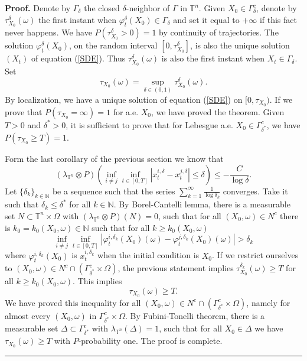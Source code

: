 \documentclass[11pt,a4paper]{article}%
\newenvironment{proof}[1][Proof]{\textbf{#1.} }{\ \rule{0.5em}{0.5em}}
\begin{document}
\begin{proof}
Denote by $\Gamma_{\delta}$ the closed $\delta$-neighbor of $\Gamma$ in
${\mathbb{T}}^{n}$. Given $X_{0}\in\Gamma_{\delta}^{c}$, denote by
$\tau_{X_{0}}^{\delta}( \omega) $ the first instant when $\varphi_{t}^{\delta
}( X_{0}) \in\Gamma_{\delta}$ and set it equal to $+\infty$ if this fact never
happens. We have $P\left(  \tau_{X_{0}}^{\delta}>0\right)  =1$ by continuity
of trajectories. The solution $\varphi_{t}^{\delta}\left(  X_{0}\right)  $, on
the random interval $\left[  0,\tau_{X_{0}}^{\delta}\right]  $, is also the
unique solution $\left(  X_{t}\right)  $ of equation (\ref{SDE}).  Thus
$\tau_{X_{0}}^{\delta}( \omega) $ is also the first instant when $X_{t}%
\in\Gamma_{\delta}$. Set%
\[
\tau_{X_{0}}( \omega) =\sup_{\delta\in( 0,1) }\tau_{X_{0}}^{\delta}( \omega)
.
\]
By localization, we have a unique solution of equation (\ref{SDE}) on
$[0,\tau_{X_{0}})$. If we prove that $P( \tau_{X_{0}}=\infty) =1$ for a.e.
$X_{0}$, we have proved the theorem. Given $T>0$ and $\delta^{\ast}>0$, it is
sufficient to prove that for Lebesgue a.e. $X_{0}\in\Gamma_{\delta^{\ast}}%
^{c}$, we have $P( \tau_{X_{0}}\geq T) =1$.

Form the last corollary of the previous section we know that%
\[
( \lambda_{{\mathbb{T}}^{n}}\otimes P) ( \inf_{i\neq j}\inf_{t\in[ 0,T] }|
x_{t}^{i,\delta}-x_{t}^{j,\delta}| \leq\delta) \leq-\frac{C}{\log\delta}.
\]
Let $\{ \delta_{k}\} _{k\in\mathbb{N}}$ be a sequence such that the series
$\sum_{k=1}^{\infty}\frac{1}{\log\delta_{k}}$ converges. Take it such that
$\delta_{k}\leq\delta^{\ast}$ for all $k\in\mathbb{N}$. By Borel-Cantelli
lemma, there is a measurable set $N\subset{\mathbb{T}}^{n}\times\Omega$ with
$( \lambda_{{\mathbb{T}}^{n}}\otimes P) ( N) =0$, such that for all $(
X_{0},\omega) \in N^{c}$ there is $k_{0}=k_{0}( X_{0},\omega) \in\mathbb{N}$
such that for all $k\geq k_{0}( X_{0},\omega) $%
\[
\inf_{i\neq j}\inf_{t\in[ 0,T] }| \varphi_{t}^{i,\delta_{k}}( X_{0}) ( \omega)
-\varphi_{t}^{j,\delta_{k}}( X_{0}) ( \omega) | >\delta_{k}%
\]
where $\varphi_{t}^{i,\delta_{k}}( X_{0}) $ is $x_{t}^{i,\delta_{k}}$ when the
initial condition is $X_{0}$. If we restrict ourselves to $( X_{0},\omega) \in
N^{c}\cap( \Gamma_{\delta^{\ast}}^{c}\times\Omega) $, the previous statement
implies $\tau_{X_{0}}^{\delta_{k}}( \omega) \geq T$ for all $k\geq k_{0}(
X_{0},\omega) $. This implies
\[
\tau_{X_{0}}( \omega) \geq T.
\]
We have proved this inequality for all $( X_{0},\omega) \in N^{c}\cap(
\Gamma_{\delta^{\ast}}^{c}\times\Omega) $, namely for almost every $(
X_{0},\omega) $ in $\Gamma_{\delta^{\ast}}^{c}\times\Omega$. By Fubini-Tonelli
theorem, there is a measurable set $\Delta\subset\Gamma_{\delta^{\ast}}^{c}$
with $\lambda_{{\mathbb{T}}^{n}}( \Delta) =1$, such that for all $X_{0}%
\in\Delta$ we have $\tau_{X_{0}}( \omega) \geq T$ with $P$-probability one.
The proof is complete.
\end{proof}
\end{document}
